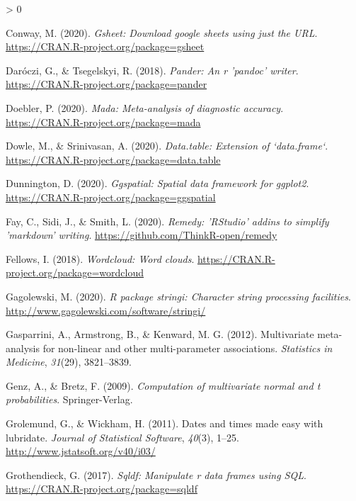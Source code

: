 \documentclass[
  american,
  man]{apa7}
\newlength{\cslhangindent}
\newenvironment{CSLReferences}[2] %
 {%
  \setlength{\parindent}{0pt}
  \ifodd #1 \everypar{\setlength{\hangindent}{\cslhangindent}}\ignorespaces\fi
  \ifnum #2 > 0
  \setlength{\parskip}{#2\baselineskip}
  \fi
 }%
 {}
\begin{document}
\begin{CSLReferences}{1}{0}
\leavevmode\hypertarget{ref-R-gsheet}{}%
Conway, M. (2020). \emph{Gsheet: Download google sheets using just the URL}. \url{https://CRAN.R-project.org/package=gsheet}

\leavevmode\hypertarget{ref-R-pander}{}%
Daróczi, G., \& Tsegelskyi, R. (2018). \emph{Pander: An r 'pandoc' writer}. \url{https://CRAN.R-project.org/package=pander}

\leavevmode\hypertarget{ref-R-mada}{}%
Doebler, P. (2020). \emph{Mada: Meta-analysis of diagnostic accuracy}. \url{https://CRAN.R-project.org/package=mada}

\leavevmode\hypertarget{ref-R-data.table}{}%
Dowle, M., \& Srinivasan, A. (2020). \emph{Data.table: Extension of `data.frame`}. \url{https://CRAN.R-project.org/package=data.table}

\leavevmode\hypertarget{ref-R-ggspatial}{}%
Dunnington, D. (2020). \emph{Ggspatial: Spatial data framework for ggplot2}. \url{https://CRAN.R-project.org/package=ggspatial}

\leavevmode\hypertarget{ref-R-remedy}{}%
Fay, C., Sidi, J., \& Smith, L. (2020). \emph{Remedy: 'RStudio' addins to simplify 'markdown' writing}. \url{https://github.com/ThinkR-open/remedy}

\leavevmode\hypertarget{ref-R-wordcloud}{}%
Fellows, I. (2018). \emph{Wordcloud: Word clouds}. \url{https://CRAN.R-project.org/package=wordcloud}

\leavevmode\hypertarget{ref-R-stringi}{}%
Gagolewski, M. (2020). \emph{R package stringi: Character string processing facilities}. \url{http://www.gagolewski.com/software/stringi/}

\leavevmode\hypertarget{ref-R-mvmeta}{}%
Gasparrini, A., Armstrong, B., \& Kenward, M. G. (2012). Multivariate meta-analysis for non-linear and other multi-parameter associations. \emph{Statistics in Medicine}, \emph{31}(29), 3821--3839.

\leavevmode\hypertarget{ref-R-mvtnorm}{}%
Genz, A., \& Bretz, F. (2009). \emph{Computation of multivariate normal and t probabilities}. Springer-Verlag.

\leavevmode\hypertarget{ref-R-lubridate}{}%
Grolemund, G., \& Wickham, H. (2011). Dates and times made easy with {lubridate}. \emph{Journal of Statistical Software}, \emph{40}(3), 1--25. \url{http://www.jstatsoft.org/v40/i03/}

\leavevmode\hypertarget{ref-R-sqldf}{}%
Grothendieck, G. (2017). \emph{Sqldf: Manipulate r data frames using SQL}. \url{https://CRAN.R-project.org/package=sqldf}


\end{CSLReferences}
\end{document}
